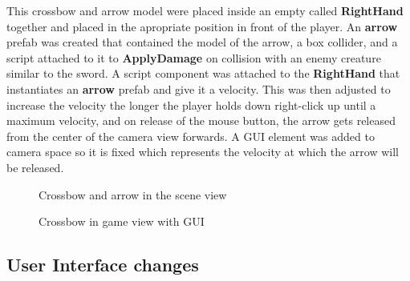 \documentclass[12pt]{report}
\begin{document}
This crossbow and arrow model were placed inside an empty called \textbf{RightHand} together and placed in the apropriate position in front of the player. An \textbf{arrow} prefab was created that contained the model of the arrow, a box collider, and a script attached to it to \textbf{ApplyDamage} on collision with an enemy creature similar to the sword. A script component was attached to the \textbf{RightHand} that instantiates an \textbf{arrow} prefab and give it a velocity. This was then adjusted to increase the velocity the longer the player holds down right-click up until a maximum velocity, and on release of the mouse button, the arrow gets released from the center of the camera view forwards. A GUI element was added to camera space so it is fixed which represents the velocity at which the arrow will be released.
\begin{figure}[H]
    \begin{minipage}{.4\textwidth}
        \centering
        \caption{Crossbow and arrow in the scene view}
    \end{minipage}
    \begin{minipage}{.6\textwidth}
        \centering
        \caption{Crossbow in game view with GUI}
    \end{minipage}
\end{figure}

\subsection{User Interface changes}
\end{document}
